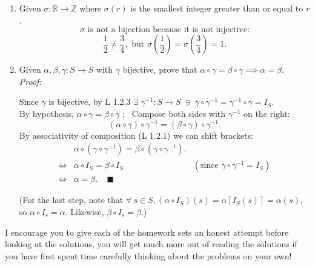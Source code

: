 \begin{enumerate}
    \item Given $\sigma: \mathbb{R} \to \mathbb{Z}$ where $\sigma(r)$ is the smallest integer greater than or equal to $r$.  
          \[
          \sigma \text{ is not a bijection because it is not injective:}
          \]
          \[
          \frac{1}{2} \neq \frac{3}{4}, \text{ but } \sigma\left(\frac{1}{2}\right) = \sigma\left(\frac{3}{4}\right) = 1.
          \]

    \item Given $\alpha, \beta, \gamma: S \to S$ with $\gamma$ bijective, prove that $\alpha \circ \gamma = \beta \circ \gamma \implies \alpha = \beta$.  \\
          \textit{Proof:}  
          
              Since $\gamma$ is bijective, by L 1.2.3 $\exists$ $\gamma^{-1}: S \to S \ \ni \ \gamma \circ \gamma^{-1} = \gamma^{-1} \circ \gamma = I_S$. \\
              By hypothesis, $\alpha \circ \gamma = \beta \circ \gamma$ ; \ 
              Compose both sides with $\gamma^{-1}$ on the right:
                    \[
                    (\alpha \circ \gamma) \circ \gamma^{-1} = (\beta \circ \gamma) \circ \gamma^{-1}.
                    \]
              By associativity of composition (L 1.2.1) we can shift brackets:
              \begin{align*}
                &\alpha \circ (\gamma \circ \gamma^{-1}) = \beta \circ (\gamma \circ \gamma^{-1}). &\\
                \iff &\alpha \circ I_S = \beta \circ I_S & (\text{since }\gamma \circ \gamma^{-1} = I_S) \\
                \iff &\alpha = \beta. \ \ \ \ \ \blacksquare &
              \end{align*}
                    
              (For the last step, note that $\forall \ s\in S, (\alpha \circ I_S)(s) = \alpha[I_S(s)]=\alpha(s)$, so $\alpha \circ I_s = \alpha$. Likewise, $\beta \circ I_s =\beta$.)
          
\end{enumerate}


\newpage

\begin{tcolorbox}
    I encourage you to give each of the homework sets an honest attempt before looking at the solutions, you will get much more out of reading the solutions if you have first spent time carefully thinking about the problems on your own!
\end{tcolorbox}
\vspace{-0.2in}
